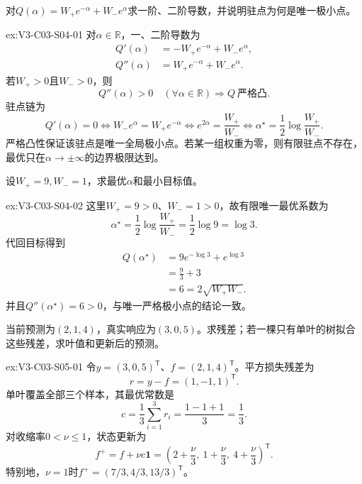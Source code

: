 \begin{SLChapterExercisePairSection}
\begin{exercise}\label{ex:V3-C03-S04-01}
对$Q(\alpha)=W_+e^{-\alpha}+W_-e^\alpha$求一阶、二阶导数，并说明驻点为何是唯一极小点。
\end{exercise}
\ifSLFullEdition
{}\label{sol:V3-C03-S04-01}
\begin{chapterexercisesolution}{ex:V3-C03-S04-01}
对$\alpha\in\mathbb R$，一、二阶导数为
\[
\begin{aligned}
Q'(\alpha)&=-W_+e^{-\alpha}+W_-e^\alpha,\\
Q''(\alpha)&=W_+e^{-\alpha}+W_-e^\alpha.
\end{aligned}
\]
若$W_+>0$且$W_->0$，则
\[
Q''(\alpha)>0\quad(\forall\alpha\in\mathbb R)
\Longrightarrow Q\ \text{严格凸}.
\]
驻点链为
\[
Q'(\alpha)=0
\Longleftrightarrow W_-e^\alpha=W_+e^{-\alpha}
\Longleftrightarrow e^{2\alpha}=\frac{W_+}{W_-}
\Longleftrightarrow
\alpha^\star=\frac12\log\frac{W_+}{W_-}.
\]
严格凸性保证该驻点是唯一全局极小点。若某一组权重为零，则有限驻点不存在，最优只在$\alpha\to\pm\infty$的边界极限达到。
\end{chapterexercisesolution}
\fi

\begin{exercise}\label{ex:V3-C03-S04-02}
设$W_+=9,W_-=1$，求最优$\alpha$和最小目标值。
\end{exercise}
\ifSLFullEdition
{}\label{sol:V3-C03-S04-02}
\begin{chapterexercisesolution}{ex:V3-C03-S04-02}
这里$W_+=9>0$、$W_-=1>0$，故有限唯一最优系数为
\[
\alpha^\star
=\frac12\log\frac{W_+}{W_-}
=\frac12\log9
=\log3.
\]
代回目标得到
\[
\begin{aligned}
Q(\alpha^\star)
&=9e^{-\log3}+e^{\log3}\\
&=\frac93+3\\
&=6
=2\sqrt{W_+W_-}.
\end{aligned}
\]
并且$Q''(\alpha^\star)=6>0$，与唯一严格极小点的结论一致。
\end{chapterexercisesolution}
\fi

\begin{exercise}\label{ex:V3-C03-S05-01}
当前预测为$(2,1,4)$，真实响应为$(3,0,5)$。求残差；若一棵只有单叶的树拟合这些残差，求叶值和更新后的预测。
\end{exercise}
\ifSLFullEdition
{}\label{sol:V3-C03-S05-01}
\begin{chapterexercisesolution}{ex:V3-C03-S05-01}
令$y=(3,0,5)^{\mathsf T}$、$f=(2,1,4)^{\mathsf T}$。平方损失残差为
\[
r=y-f=(1,-1,1)^{\mathsf T}.
\]
单叶覆盖全部三个样本，其最优常数是
\[
c=\frac13\sum_{i=1}^{3}r_i
=\frac{1-1+1}{3}=\frac13.
\]
对收缩率$0<\nu\leq1$，状态更新为
\[
f^+=f+\nu c\mathbf1
=\left(2+\frac\nu3,\ 1+\frac\nu3,\ 4+\frac\nu3\right)^{\mathsf T}.
\]
特别地，$\nu=1$时$f^+=(7/3,4/3,13/3)^{\mathsf T}$。
\end{chapterexercisesolution}
\fi


\end{SLChapterExercisePairSection}
